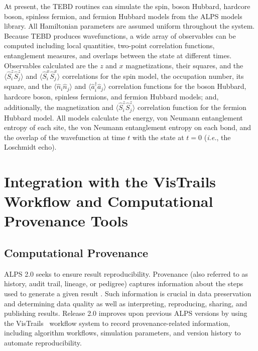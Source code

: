 \documentclass[12pt]{iopart}
\begin{document}
At present, the TEBD routines can simulate the spin, boson Hubbard, hardcore boson, spinless fermion, and fermion Hubbard models from the ALPS models library.  All 
Hamiltonian parameters are assumed uniform throughout the system.  Because TEBD produces wavefunctions, a wide array of observables can be computed including local quantities, two-point correlation functions, entanglement measures, and overlaps between the state at different times.  Observables calculated are the $z$ and $x$ magnetizations, their squares, and the $\langle \hat{S}^z_i 
\hat{S}^z_j\rangle$ and $\langle \hat{S}^x_i \hat{S}^x_j\rangle$ correlations for the spin model, the occupation number, its square, and the $\langle \hat{n}_i \hat{n}_j\rangle$ and 
$\langle \hat{a}_i^{\dagger} \hat{a}_j\rangle$ correlation functions for the boson Hubbard, hardcore boson, spinless fermions, and fermion Hubbard models; and, additionally, 
the magnetization and $\langle \hat{S}^z_i \hat{S}^z_j\rangle$ correlation function for the fermion Hubbard model.  All models calculate the energy, von Neumann entanglement 
entropy of each site, the von Neumann entanglement entropy on each bond, and the overlap of the wavefunction at time $t$ with the state at $t=0$ ({\it i.e.}, the Loschmidt echo).


\section{Integration with the VisTrails Workflow and Computational Provenance Tools}

\subsection{Computational Provenance}

ALPS 2.0 seeks to ensure result reproducibility.  Provenance (also
referred to as history, audit trail, lineage, or pedigree) captures
information about the steps used to generate a given result
\cite{Silva07,Freire08}.  Such information is crucial in data
preservation and determining data quality as well as interpreting,
reproducing, sharing, and publishing results.  Release 2.0 improves
upon previous ALPS versions by using the VisTrails~\cite{vistrails}
workflow system to record provenance-related information, including
algorithm workflows, simulation parameters, and version history to automate
reproducibility.
\end{document}
